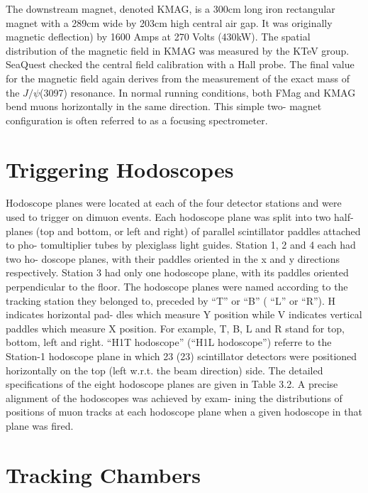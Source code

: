 The downstream magnet, denoted KMAG, is a 300cm long iron rectangular magnet with a 289cm wide by 203cm high central air gap.  It was originally 
magnetic deflection) by 1600 Amps at 270 Volts (430kW).  The spatial distribution of the magnetic field in KMAG was measured by the KTeV group.  
SeaQuest checked the central field calibration with a Hall probe.  The final value for the magnetic field again derives from the measurement of 
the exact mass of the $J/\psi$(3097) resonance.   In normal running conditions, both FMag and KMAG bend muons horizontally in the same direction.  
This simple two- magnet configuration is often referred to as a focusing spectrometer.


\section{Triggering Hodoscopes}

Hodoscope planes were located at each of the four detector stations and were used
to trigger on dimuon events. Each hodoscope plane was split into two half-planes
(top and bottom, or left and right) of parallel scintillator paddles attached to pho-
tomultiplier tubes by plexiglass light guides. Station 1, 2 and 4 each had two ho-
doscope planes, with their paddles oriented in the x and y directions respectively.
Station 3 had only one hodoscope plane, with its paddles oriented perpendicular to
the floor. The hodoscope planes were named according to the tracking station they
belonged to, preceded by “T” or “B” ( “L” or “R”). H indicates horizontal pad-
dles which measure Y position while V indicates vertical paddles which measure X
position. For example, T, B, L and R stand for top, bottom, left and right. “H1T
hodoscope” (“H1L hodoscope”) referre to the Station-1 hodoscope plane in which
23 (23) scintillator detectors were positioned horizontally on the top (left w.r.t. the
beam direction) side. The detailed specifications of the eight hodoscope planes are
given in Table 3.2. A precise alignment of the hodoscopes was achieved by exam-
ining the distributions of positions of muon tracks at each hodoscope plane when a
given hodoscope in that plane was fired.

\section{Tracking Chambers}

